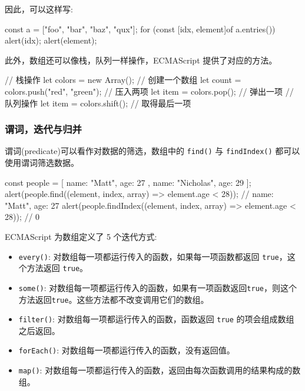 因此，可以这样写:

\begin{JavaScript}
const a = ["foo", "bar", "baz", "qux"]; 
for (const [idx, element]of a.entries()) {
    alert(idx);
    alert(element);
}
\end{JavaScript}

此外，数组还可以像栈，队列一样操作，ECMAScript 提供了对应的方法。

\begin{JavaScript}
// 栈操作
let colors = new Array();   // 创建一个数组
let count = colors.push("red", "green");  // 压入两项
let item = colors.pop();       // 弹出一项
// 队列操作
let item = colors.shift();  // 取得最后一项
\end{JavaScript}

\subsubsection{谓词，迭代与归并}

谓词(predicate)可以看作对数据的筛选，数组中的 \texttt{find()} 与 \texttt{findIndex()} 都可以使用谓词筛选数据。

\begin{JavaScript}
const people = [
    {
        name: "Matt",     
        age: 27   
    },   
    {     
        name: "Nicholas",     
        age: 29   
    } 
]; 
alert(people.find((element, index, array) => element.age < 28)); 
// {name: "Matt", age: 27} 
alert(people.findIndex((element, index, array) => element.age < 28)); 
// 0
\end{JavaScript}

ECMAScript 为数组定义了 5 个迭代方式:
\begin{itemize}
    \item \texttt{every()}: 对数组每一项都运行传入的函数，如果每一项函数都返回 \texttt{true}，这个方法返回 \texttt{true}。
    \item \texttt{some()}: 对数组每一项都运行传入的函数，如果有一项函数返回\texttt{true}，则这个方法返回\texttt{true}。这些方法都不改变调用它们的数组。
    \item \texttt{filter()}: 对数组每一项都运行传入的函数，函数返回 \texttt{true} 的项会组成数组之后返回。
    \item \texttt{forEach()}: 对数组每一项都运行传入的函数，没有返回值。
    \item \texttt{map()}: 对数组每一项都运行传入的函数，返回由每次函数调用的结果构成的数组。
\end{itemize}

